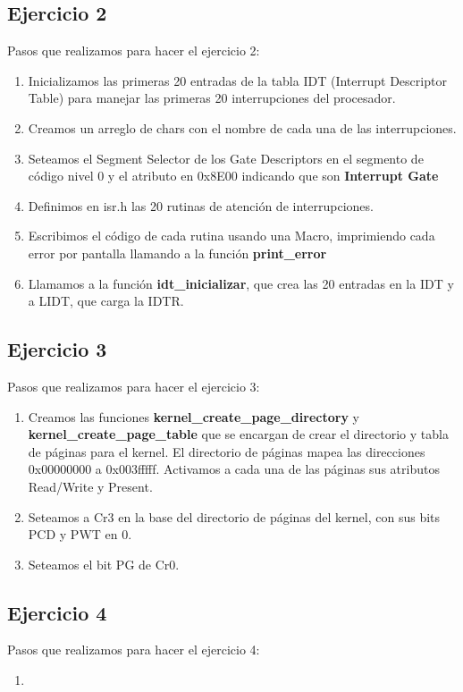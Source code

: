 \documentclass[a4paper,10pt]{article}
\begin{document}
\begin{enumerate}
\subsection{Ejercicio 2}
Pasos que realizamos para hacer el ejercicio 2:
\begin{enumerate}
  \item Inicializamos las primeras 20 entradas de la tabla IDT (Interrupt Descriptor Table) para manejar las primeras 20 interrupciones del procesador.
  \item Creamos un arreglo de chars con el nombre de cada una de las interrupciones.
  \item Seteamos el Segment Selector de los Gate Descriptors en el segmento de código nivel 0 y el atributo en 0x8E00 indicando que son \textbf{Interrupt Gate}
  \item Definimos en isr.h las 20 rutinas de atención de interrupciones.
  \item Escribimos el código de cada rutina usando una Macro, imprimiendo cada error por pantalla llamando a la función \textbf{print\_error} 
  \item Llamamos a la función \textbf{idt\_inicializar}, que crea las 20 entradas en la IDT y a LIDT, que carga la IDTR.
\end{enumerate}

\subsection{Ejercicio 3}
Pasos que realizamos para hacer el ejercicio 3:
\begin{enumerate}
  \item Creamos las funciones \textbf{kernel\_create\_page\_directory} y \textbf{kernel\_create\_page\_table} que se encargan de crear el directorio y tabla de páginas para el kernel.
    El directorio de páginas mapea las direcciones 0x00000000 a 0x003fffff. Activamos a cada una de las páginas sus atributos Read/Write y Present.
  \item Seteamos a Cr3 en la base del directorio de páginas del kernel, con sus bits PCD y PWT en 0.
  \item Seteamos el bit PG de Cr0.
\end{enumerate} 

\subsection{Ejercicio 4}
Pasos que realizamos para hacer el ejercicio 4:
\begin{enumerate}
  \item
\end{enumerate}


\end{enumerate}
\end{document}
